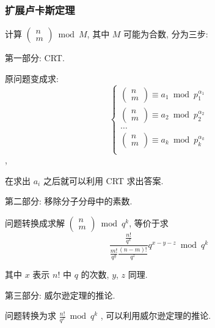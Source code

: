 \documentclass[UTF8, a4paper, titlepage, twoside]{ctexart}
\begin{document}
\subsubsection{ 扩展卢卡斯定理 }
计算 $\left(\begin{array}{cl}n \\ m\end{array}\right) \bmod M$, 其中 $M$ 可能为合数, 分为三步:

第一部分: CRT.

原问题变成求: 
$$
\left \{
\begin{array}{ll}
\left(\begin{array}{cl}n \\ m\end{array}\right) \equiv a_1 \bmod p_1^{\alpha_1} \\
\left(\begin{array}{cl}n \\ m\end{array}\right) \equiv a_2 \bmod p_2^{\alpha_2} \\
\dots \\
\left(\begin{array}{cl}n \\ m\end{array}\right) \equiv a_k \bmod p_k^{\alpha_k} \\
\end{array}
\right.
$$,

在求出 $a_i$ 之后就可以利用 CRT 求出答案.

第二部分: 移除分子分母中的素数.

问题转换成求解 $\left(\begin{array}{cl}n \\ m\end{array}\right) \bmod q^k$, 等价于求
$$
\frac{\frac{n!}{q^x}}{\frac{m!}{q^y}\frac{(n - m)!}{q^z}} q^{x - y - z} \bmod q^k
$$

其中 $x$ 表示 $n!$ 中 $q$ 的次数, $y$, $z$ 同理.

第三部分: 威尔逊定理的推论.

问题转换为求 $\frac{n!}{q^x} \bmod q^k$ , 可以利用威尔逊定理的推论.
\end{document}
